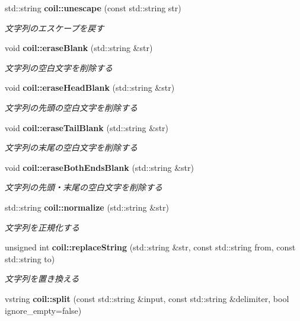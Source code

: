 \begin{DoxyCompactItemize}
std::string {\bf coil::unescape} (const std::string str)
\begin{DoxyCompactList}\small\item\em 文字列のエスケープを戻す \item\end{DoxyCompactList}\item 
void {\bf coil::eraseBlank} (std::string \&str)
\begin{DoxyCompactList}\small\item\em 文字列の空白文字を削除する \item\end{DoxyCompactList}\item 
void {\bf coil::eraseHeadBlank} (std::string \&str)
\begin{DoxyCompactList}\small\item\em 文字列の先頭の空白文字を削除する \item\end{DoxyCompactList}\item 
void {\bf coil::eraseTailBlank} (std::string \&str)
\begin{DoxyCompactList}\small\item\em 文字列の末尾の空白文字を削除する \item\end{DoxyCompactList}\item 
void {\bf coil::eraseBothEndsBlank} (std::string \&str)
\begin{DoxyCompactList}\small\item\em 文字列の先頭・末尾の空白文字を削除する \item\end{DoxyCompactList}\item 
std::string {\bf coil::normalize} (std::string \&str)
\begin{DoxyCompactList}\small\item\em 文字列を正規化する \item\end{DoxyCompactList}\item 
unsigned int {\bf coil::replaceString} (std::string \&str, const std::string from, const std::string to)
\begin{DoxyCompactList}\small\item\em 文字列を置き換える \item\end{DoxyCompactList}\item 
vstring {\bf coil::split} (const std::string \&input, const std::string \&delimiter, bool ignore\_\-empty=false)

\end{DoxyCompactItemize}
